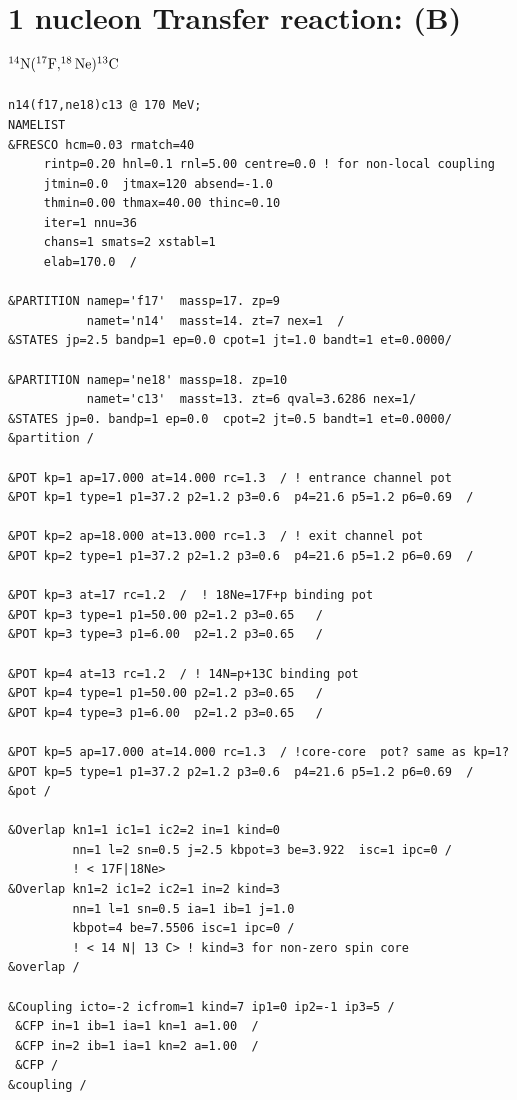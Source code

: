\documentclass[11pt]{book}
\begin{document}
\section{1 nucleon Transfer reaction: (B) 
       ${}^{14}{\rm N}(^{17}{\rm F},^{18}{\rm Ne})^{13}{\rm C}$}
\begin{small}        
\begin{lstlisting}[frame=single]
n14(f17,ne18)c13 @ 170 MeV; 
NAMELIST
&FRESCO hcm=0.03 rmatch=40 
     rintp=0.20 hnl=0.1 rnl=5.00 centre=0.0 ! for non-local coupling
	 jtmin=0.0  jtmax=120 absend=-1.0
	 thmin=0.00 thmax=40.00 thinc=0.10
	 iter=1 nnu=36
	 chans=1 smats=2 xstabl=1 
	 elab=170.0  /

&PARTITION namep='f17'  massp=17. zp=9 
           namet='n14'  masst=14. zt=7 nex=1  /
&STATES jp=2.5 bandp=1 ep=0.0 cpot=1 jt=1.0 bandt=1 et=0.0000/

&PARTITION namep='ne18' massp=18. zp=10 
           namet='c13'  masst=13. zt=6 qval=3.6286 nex=1/
&STATES jp=0. bandp=1 ep=0.0  cpot=2 jt=0.5 bandt=1 et=0.0000/
&partition /

&POT kp=1 ap=17.000 at=14.000 rc=1.3  / ! entrance channel pot
&POT kp=1 type=1 p1=37.2 p2=1.2 p3=0.6  p4=21.6 p5=1.2 p6=0.69  /

&POT kp=2 ap=18.000 at=13.000 rc=1.3  / ! exit channel pot
&POT kp=2 type=1 p1=37.2 p2=1.2 p3=0.6  p4=21.6 p5=1.2 p6=0.69  /

&POT kp=3 at=17 rc=1.2  /  ! 18Ne=17F+p binding pot 
&POT kp=3 type=1 p1=50.00 p2=1.2 p3=0.65   /
&POT kp=3 type=3 p1=6.00  p2=1.2 p3=0.65   /

&POT kp=4 at=13 rc=1.2  / ! 14N=p+13C binding pot
&POT kp=4 type=1 p1=50.00 p2=1.2 p3=0.65   /
&POT kp=4 type=3 p1=6.00  p2=1.2 p3=0.65   /

&POT kp=5 ap=17.000 at=14.000 rc=1.3  / !core-core  pot? same as kp=1? 
&POT kp=5 type=1 p1=37.2 p2=1.2 p3=0.6  p4=21.6 p5=1.2 p6=0.69  /
&pot /

&Overlap kn1=1 ic1=1 ic2=2 in=1 kind=0 
         nn=1 l=2 sn=0.5 j=2.5 kbpot=3 be=3.922  isc=1 ipc=0 /
         ! < 17F|18Ne>
&Overlap kn1=2 ic1=2 ic2=1 in=2 kind=3 
         nn=1 l=1 sn=0.5 ia=1 ib=1 j=1.0 
         kbpot=4 be=7.5506 isc=1 ipc=0 / 
         ! < 14 N| 13 C> ! kind=3 for non-zero spin core 
&overlap /

&Coupling icto=-2 icfrom=1 kind=7 ip1=0 ip2=-1 ip3=5 /
 &CFP in=1 ib=1 ia=1 kn=1 a=1.00  /
 &CFP in=2 ib=1 ia=1 kn=2 a=1.00  /
 &CFP /
&coupling /
\end{lstlisting}
\end{small} 
\end{document}
